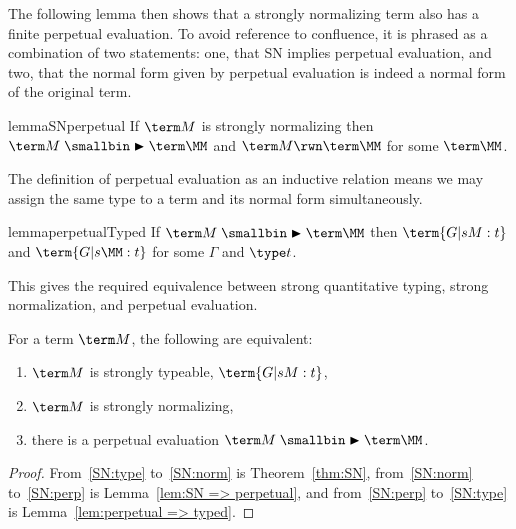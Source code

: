 \documentclass[a4paper,UKenglish,cleveref, autoref, thm-restate]{lipics-v2021}
\newcommand\rp{\mathrel{\smallbin\blacktriangleright}}
\begin{document}
The following lemma then shows that a strongly normalizing term also has a finite perpetual evaluation. To avoid reference to confluence, it is phrased as a combination of two statements: one, that SN implies perpetual evaluation, and two, that the normal form given by perpetual evaluation is indeed a normal form of the original term.

\begin{restatable}{lemma}{SNperpetual}
\label{lem:SN => perpetual}
If $\term M$ is strongly normalizing then $\term M\rp\term\MM$ and $\term M\rwn\term\MM$ for some $\term\MM$.
\end{restatable}

The definition of perpetual evaluation as an inductive relation means we may assign the same type to a term and its normal form simultaneously.

\begin{restatable}{lemma}{perpetualTyped}
\label{lem:perpetual => typed}
If $\term M\rp\term\MM$ then $\term{G |s M:t}$ and $\term{G |s \MM:t}$ for some $\Gamma$ and $\type t$.
\end{restatable}

This gives the required equivalence between strong quantitative typing, strong normalization, and perpetual evaluation.

\begin{theorem}
\label{thm:strong}
For a term $\term M$, the following are equivalent:
\begin{enumerate}

\item\label{SN:type} $\term M$ is strongly typeable, $\term{G |s M:t}$,
\item\label{SN:norm} $\term M$ is strongly normalizing,
\item\label{SN:perp} there is a perpetual evaluation $\term M\rp\term\MM$.
\end{enumerate}
\end{theorem}

\begin{proof}
From~\ref{SN:type} to~\ref{SN:norm} is Theorem~\ref{thm:SN}, from~\ref{SN:norm} to~\ref{SN:perp} is Lemma~\ref{lem:SN => perpetual}, and from~\ref{SN:perp} to~\ref{SN:type} is Lemma~\ref{lem:perpetual => typed}.
\end{proof}
\end{document}
